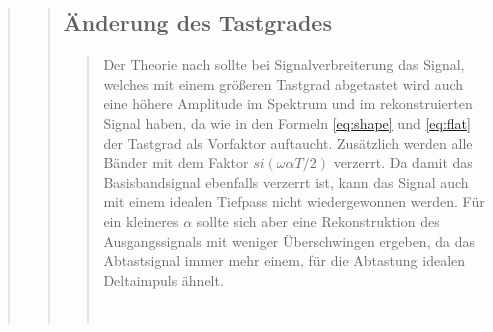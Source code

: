 \begin{quote}
\begin{quote}
\begin{quote}
          
            
          
        \end{quote}
        
        
        \subsection{Änderung des Tastgrades}
        \begin{quote}
             
             Der Theorie nach sollte bei Signalverbreiterung das Signal, welches mit einem größeren Tastgrad abgetastet
             wird auch eine höhere Amplitude im Spektrum und im rekonstruierten Signal haben, da wie in den Formeln \ref{eq:shape} und
             \ref{eq:flat} der Tastgrad als Vorfaktor auftaucht. Zusätzlich werden alle Bänder mit dem Faktor
             $si(\omega \alpha T/2)$ verzerrt. Da damit das Basisbandsignal ebenfalls verzerrt ist, kann das Signal auch mit einem idealen
             Tiefpass nicht wiedergewonnen werden. Für ein kleineres $\alpha$ sollte sich aber eine
             Rekonstruktion des Ausgangssignals mit weniger Überschwingen ergeben, da das Abtastsignal immer mehr einem,
             für die Abtastung idealen Deltaimpuls ähnelt.\\
             \\
             
              \begin{center}
            \begin{tabular}{ll}
            

\end{tabular}
\end{center}
\end{quote}
\end{quote}
\end{quote}
